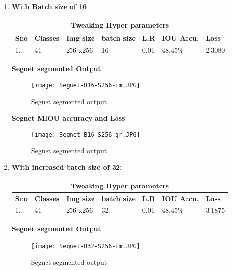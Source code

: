 \documentclass{IEEEtran}
\begin{document}
\begin{enumerate}
    \item \textbf{With Batch size of 16}
\newline

\begin{tabular}{ |p{0.6cm}|p{1.2cm}|p{0.6cm}|p{0.6cm}|p{0.6cm}|p{0.8cm}|p{0.8cm}|}
 \hline
 \multicolumn{7}{|c|}{\textbf{Tweaking Hyper parameters}} \\
 \hline
 \textbf{Sno} & \textbf{Classes} & \textbf{Img size} & \textbf{batch size} & \textbf{L.R} & \textbf{IOU Accu.} & \textbf{Loss} \\
 \hline
 1. & 41   & 256 x256    & 16  & 0.01 & 48.45\% & 2.3080 \\
 \hline
\end{tabular}

\textbf{Segnet segmented Output}

\begin{figure}[h]
    \centering
    \captionsetup{justification=centering}
    \texttt{[image: Segnet-B16-S256-im.JPG]}
    \caption{Segnet segmented output}
    \label{fig:Binary class segmented output}
\end{figure}

\textbf{Segnet MIOU accuracy and Loss}

\begin{figure}[h]
    \centering
    \captionsetup{justification=centering}
    \texttt{[image: Segnet-B16-S256-gr.JPG]}
    \caption{Segnet segmented output}
    \label{fig:Binary class segmented output}
\end{figure}

\item \textbf{With increased batch size of 32:}
\newline
\begin{tabular}{ |p{0.6cm}|p{1.2cm}|p{0.6cm}|p{0.6cm}|p{0.6cm}|p{0.8cm}|p{0.8cm}|}
 \hline
 \multicolumn{7}{|c|}{\textbf{Tweaking Hyper parameters}} \\
 \hline
 \textbf{Sno} & \textbf{Classes} & \textbf{Img size} & \textbf{batch size} & \textbf{L.R} & \textbf{IOU Accu.} & \textbf{Loss} \\
 \hline
 1. & 41   & 256 x256    & 32  & 0.01 & 48.45\% & 3.1875 \\
 \hline
\end{tabular}
\newline

\textbf{Segnet segmented Output}

\begin{figure}[h]
    \centering
    \captionsetup{justification=centering}
    \texttt{[image: Segnet-B32-S256-im.JPG]}
    \caption{Segnet segmented output}
    \label{fig:Binary class segmented output}
\end{figure}


\end{enumerate}
\end{document}
